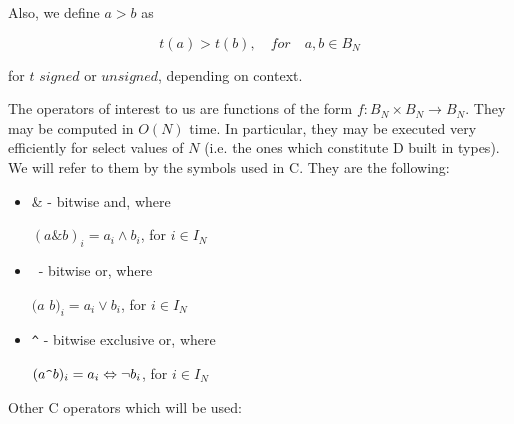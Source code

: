 \documentclass{article}
\begin{document}
Also, we define $a>b$ as 

\begin{equation*}t(a)>t(b), \quad for \quad a,b \in B_N\end{equation*}

for $t$ $signed$ or $unsigned$, depending on context.
\vspace{10pt}

The operators of interest to us are functions of the form 
$f : B_N \times B_N \rightarrow B_N$. 
They may be computed in $O(N)$ time. In particular, they may be executed 
very efficiently for select values of $N$ (i.e. the ones which constitute 
D built in types).
We will refer to them by the symbols used in C. They are the 
following:
\begin{itemize}
\item \& - bitwise and, where

$(a \& b)_i = a_i \wedge b_i$, for $i \in I_N$
\item \textbar \,  - bitwise or, where

$(a$ \textbar $b)_i = a_i \vee b_i$, for $i \in I_N$
\item \verb!^!  - bitwise exclusive or, where

$(a \verb!^! b)_i = a_i \Leftrightarrow \neg b_i$, for $i \in I_N$
\end{itemize}

Other C operators which will be used:
\end{document}
